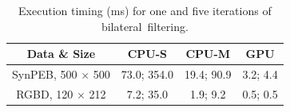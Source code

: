 
\begin{table}[H]
\centering
\caption{Execution timing (ms) for one and five iterations of bilateral~filtering.}\label{table:results_bilateral}
\begin{tabular}{@{}cccc@{}}
\toprule
\textbf{Data \& Size}    & \textbf{CPU-S}       & \textbf{CPU-M}           & \textbf{GPU}      \\ \midrule
SynPEB, 500 $\times$ 500 & 73.0; 354.0 & 19.4; 90.9      & 3.2; 4.4 \\
RGBD, 120 $\times$ 212   & 7.2; 35.0   & 1.9; 9.2        & 0.5; 0.5 \\ \bottomrule
\end{tabular}
\end{table}
\unskip



